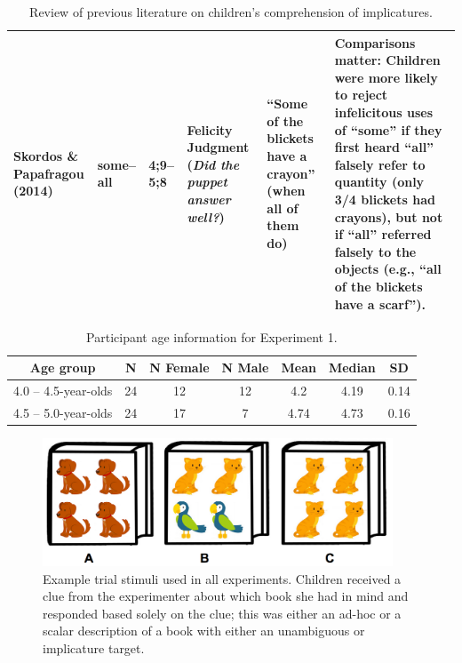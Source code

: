 \documentclass[man]{apa2}
\begin{document}
\begin{landscape}
\begin{table}[!ht]
\begin{tabular}{| p{2.2cm} | p{2cm} | p{1.69cm} | p{4.5cm} | p{5cm} | p{7.2cm} |}
\parbox[t]{2.2cm}{Skordos \&\\Papafragou (2014)} & some--all & 4;9--5;8 & Felicity Judgment (\textit{Did the puppet answer well?}) & ``Some of the blickets have a crayon'' (when all of them do)  & Comparisons matter: Children were more likely to reject infelicitous uses of ``some'' if they first heard ``all'' falsely refer to quantity (only 3/4 blickets had crayons), but not if ``all'' referred falsely to the objects (e.g., ``all of the blickets have a scarf'').\\ \hline \end{tabular}
\caption{\label{tab:lit_review}Review of previous literature on children's comprehension of implicatures.}
\end{table}
\end{landscape}
\restoregeometry

\newpage

\begin{table}[tb]
\centering
\begin{tabular}{ccccccc}
\hline
{\bf Age group} & {\bf N} & {\bf N Female} & {\bf N Male} & {\bf Mean} & {\bf Median} & {\bf SD} \\
\hline
4.0 -- 4.5-year-olds & 24 & 12 & 12 & 4.2 & 4.19 & 0.14 \\
4.5 -- 5.0-year-olds & 24 & 17 & 7 & 4.74 & 4.73 & 0.16\\
\hline
\end{tabular}
\caption{\label{tab:exp_1_demo}Participant age information for Experiment 1.}
\end{table}

\begin{figure}
 \begin{center}
  \includegraphics[height=1.5in]{figures/implicatures_demo_letters.png}
  \caption{\label{fig:demo} Example trial stimuli used in all experiments. Children received a clue from the experimenter about which book she had in mind and responded based solely on the clue; this was either an ad-hoc or a scalar description of a book with either an unambiguous or implicature target.}
 \end{center}
\end{figure}
\end{document}

